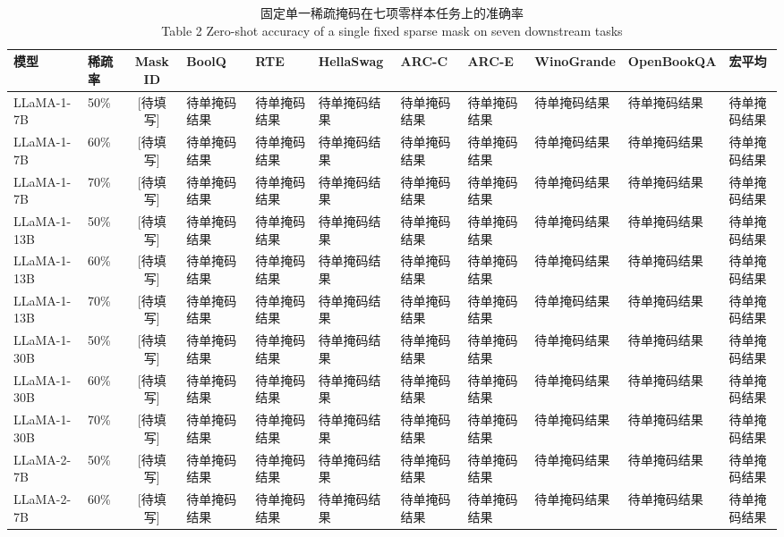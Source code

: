 \documentclass[UTF8,fontset=fandol]{ctexart}
\renewcommand{\arraystretch}{1.08}
\begin{document}
\begin{table}[!htbp]
\centering
\caption{固定单一稀疏掩码在七项零样本任务上的准确率\\
Table 2 Zero-shot accuracy of a single fixed sparse mask on seven downstream tasks}
\label{tab:zero}
\scriptsize
\setlength{\tabcolsep}{2.2pt}
\renewcommand{\arraystretch}{0.94}
\begin{tabular*}{0.98\textwidth}{@{\extracolsep{\fill}}llcllllllll@{}}
\toprule
模型 & 稀疏率 & Mask ID & BoolQ & RTE & HellaSwag & ARC-C & ARC-E & WinoGrande & OpenBookQA & 宏平均 \\
\midrule
LLaMA-1-7B  & 50\% & [待填写] & 待单掩码结果 & 待单掩码结果 & 待单掩码结果 & 待单掩码结果 & 待单掩码结果 & 待单掩码结果 & 待单掩码结果 & 待单掩码结果 \\
LLaMA-1-7B  & 60\% & [待填写] & 待单掩码结果 & 待单掩码结果 & 待单掩码结果 & 待单掩码结果 & 待单掩码结果 & 待单掩码结果 & 待单掩码结果 & 待单掩码结果 \\
LLaMA-1-7B  & 70\% & [待填写] & 待单掩码结果 & 待单掩码结果 & 待单掩码结果 & 待单掩码结果 & 待单掩码结果 & 待单掩码结果 & 待单掩码结果 & 待单掩码结果 \\
LLaMA-1-13B & 50\% & [待填写] & 待单掩码结果 & 待单掩码结果 & 待单掩码结果 & 待单掩码结果 & 待单掩码结果 & 待单掩码结果 & 待单掩码结果 & 待单掩码结果 \\
LLaMA-1-13B & 60\% & [待填写] & 待单掩码结果 & 待单掩码结果 & 待单掩码结果 & 待单掩码结果 & 待单掩码结果 & 待单掩码结果 & 待单掩码结果 & 待单掩码结果 \\
LLaMA-1-13B & 70\% & [待填写] & 待单掩码结果 & 待单掩码结果 & 待单掩码结果 & 待单掩码结果 & 待单掩码结果 & 待单掩码结果 & 待单掩码结果 & 待单掩码结果 \\
LLaMA-1-30B & 50\% & [待填写] & 待单掩码结果 & 待单掩码结果 & 待单掩码结果 & 待单掩码结果 & 待单掩码结果 & 待单掩码结果 & 待单掩码结果 & 待单掩码结果 \\
LLaMA-1-30B & 60\% & [待填写] & 待单掩码结果 & 待单掩码结果 & 待单掩码结果 & 待单掩码结果 & 待单掩码结果 & 待单掩码结果 & 待单掩码结果 & 待单掩码结果 \\
LLaMA-1-30B & 70\% & [待填写] & 待单掩码结果 & 待单掩码结果 & 待单掩码结果 & 待单掩码结果 & 待单掩码结果 & 待单掩码结果 & 待单掩码结果 & 待单掩码结果 \\
LLaMA-2-7B  & 50\% & [待填写] & 待单掩码结果 & 待单掩码结果 & 待单掩码结果 & 待单掩码结果 & 待单掩码结果 & 待单掩码结果 & 待单掩码结果 & 待单掩码结果 \\
LLaMA-2-7B  & 60\% & [待填写] & 待单掩码结果 & 待单掩码结果 & 待单掩码结果 & 待单掩码结果 & 待单掩码结果 & 待单掩码结果 & 待单掩码结果 & 待单掩码结果 \\

\end{tabular*}
\end{table}
\end{document}
